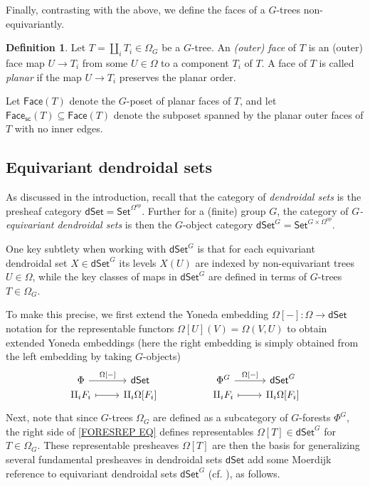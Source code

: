\documentclass[a4paper,10pt
,draft
]{article}%
\numberwithin{equation}{section}
\numberwithin{figure}{section}
\theoremstyle{definition} %
\newtheorem{definition}[equation]{Definition}%
\newcommand{\1}{\ensuremath{\mathbbm 1}}%
\begin{document}
Finally, contrasting with the above, we define the faces of a $G$-trees non-equivariantly.

\begin{definition}
	Let $T = \amalg_i T_i \in \Omega_G$ be a $G$-tree.
	An \textit{(outer) face} of $T$ is an (outer) face map $U \to T_i$ from some $U \in \Omega$ to a component $T_i$ of $T$.
	A face of $T$ is called \textit{planar} if the map $U \to T_i$ preserves the planar order.

	Let $\mathsf{Face}(T)$ denote the $G$-poset of planar faces of $T$,
	and let $\mathsf{Face}_{\mathsf{sc}}(T) \subseteq \mathsf{Face}(T)$ denote the subposet spanned by the planar outer faces of $T$ with no inner edges.
\end{definition}





\subsection{Equivariant dendroidal sets}
\label{EDS_SEC}

As {\color{red} discussed in the introduction},
recall that the category of 
\emph{dendroidal sets}
is the presheaf category
$\mathsf{dSet} = \mathsf{Set}^{\Omega^{op}}$.
Further for a (finite) group $G$,
the category of
\emph{$G$-equivariant dendroidal sets}
is then the $G$-object category
$\mathsf{dSet}^G = \mathsf{Set}^{G \times \Omega^{op}}$.


One key subtlety when working with 
$\mathsf{dSet}^G$
is that for each equivariant dendroidal set 
$X \in \mathsf{dSet}^G$
its levels $X(U)$ are indexed by
non-equivariant trees $U \in \Omega$,
while the key classes of maps in $\mathsf{dSet}^G$ are defined in terms
of $G$-trees $T \in \Omega_G$.

To make this precise, 
we first extend the Yoneda embedding
$\Omega[-]\colon \Omega \to \mathsf{dSet}$
notation
for the representable functors
$\Omega[U](V) = \Omega(V,U)$
to obtain extended Yoneda embeddings
(here the right embedding is simply obtained from the left embedding by taking $G$-objects)
\begin{equation}\label{FORESREP EQ}
\begin{tikzcd}[row sep=0]
	\Phi \ar{r}{\Omega[-]}
&
	\mathsf{dSet}
&&%
	\Phi^G \ar{r}{\Omega[-]}
&
	\mathsf{dSet}^G
\\
	\amalg_i F_i
	\ar[mapsto]{r}
&
	\amalg_i \Omega[F_i]
&&%
	\amalg_i F_i
	\ar[mapsto]{r}
&
	\amalg_i \Omega[F_i]
\end{tikzcd}
\end{equation}
Next, note that since $G$-trees $\Omega_G$
are defined as a subcategory of $G$-forests $\Phi^G$,
the right side of 
\eqref{FORESREP EQ}
defines representables 
$\Omega[T] \in \mathsf{dSet}^G$
for $T \in \Omega_G$.
These representable presheaves 
$\Omega[T]$
are then the basis for
generalizing several fundamental
presheaves in dendroidal sets $\mathsf{dSet}$
{\color{red} add some Moerdijk reference}
to equivariant dendroidal sets
$\mathsf{dSet}^G$
(cf. \cite[\S 6]{Per18}),
as follows.
\end{document}
